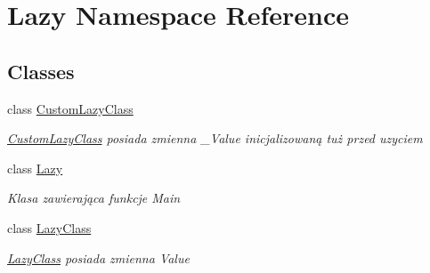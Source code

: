 \hypertarget{namespace_lazy}{}\section{Lazy Namespace Reference}
\label{namespace_lazy}
\subsection*{Classes}
\begin{DoxyCompactItemize}
\item 
class \hyperlink{class_lazy_1_1_custom_lazy_class}{Custom\+Lazy\+Class}
\begin{DoxyCompactList}\small\item\em \hyperlink{class_lazy_1_1_custom_lazy_class}{Custom\+Lazy\+Class} posiada zmienna \+\_\+\+Value inicjalizowaną tuż przed uzyciem \end{DoxyCompactList}\item 
class \hyperlink{class_lazy_1_1_lazy}{Lazy}
\begin{DoxyCompactList}\small\item\em Klasa zawierająca funkcje Main \end{DoxyCompactList}\item 
class \hyperlink{class_lazy_1_1_lazy_class}{Lazy\+Class}
\begin{DoxyCompactList}\small\item\em \hyperlink{class_lazy_1_1_lazy_class}{Lazy\+Class} posiada zmienna Value \end{DoxyCompactList}\end{DoxyCompactItemize}
